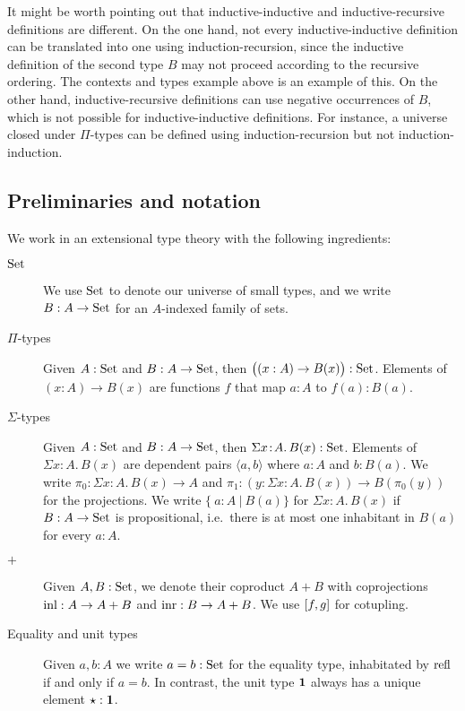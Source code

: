 \documentclass[orivec,envcountsame, ,envcountsect]{llncs}
\begin{document}
It might be worth pointing out that inductive-inductive and
inductive-recursive definitions are different. On the one hand, not
every inductive-inductive definition can be %
translated into one using induction-recursion, since the inductive
definition of the second type $B$ may not proceed according to the
recursive ordering. The contexts and types example above is an example
of this. On the other hand, inductive-recursive definitions can use
negative occurrences of $B$, which is not possible for
inductive-inductive definitions. For instance, a universe closed under
$\Pi$-types can be defined using induction-recursion but not
induction-induction.




\subsection{Preliminaries and notation}

We work in an extensional type theory \cite{NPS1990book} with the
following ingredients:
\begin{description}
\item[$\text{Set}$] We use $\text{Set}$ to denote our universe of small types, and
  we write $B : A \to \text{Set}$ for an $A$-indexed family of sets.
\item[$\Pi$-types] Given $A : \text{Set}$ and $B : A \to \text{Set}$, then $\big((x :
  A) \to B(x)\big) : \text{Set}$.  Elements of $(x : A) \to B(x)$ are
  functions $f$ that map $a : A$ to $f(a) : B(a)$.
\item[$\Sigma$-types] Given $A : \text{Set}$ and $B : A \to \text{Set}$, then
  $\Sigma x\!:\!A.\, B(x) : \text{Set}$. Elements of $\Sigma x\!:\!A.\,
  B(x)$ are dependent pairs $\langle a, b\rangle$ where $a : A$ and $b : B(a)$.
  We write $\pi_0 : \Sigma x\!:\!A.\, B(x) \to A$ and $\pi_1 : (y :
  \Sigma x\!:\!A.\, B(x)) \to B(\pi_0(y))$ for the projections. We write $\{\ a : A\ |\
  B(a)\}$ for $\Sigma x\!:\!A.\, B(x)$ if $B
  : A \to \text{Set}$ is propositional, i.e.\ there is at most one
  inhabitant in $B(a)$ for every $a : A$.
\item[$+$] Given $A, B : \text{Set}$, we denote their coproduct $A + B$ with
  coprojections $\text{inl} : A \to A + B$ and $\text{inr} : B \to A + B$. We
  use $[f, g]$ for cotupling.
\item[Equality and unit types] Given $a, b : A$ we write $a = b :
  \text{Set}$ for the equality type, inhabitated by $\text{refl}$ if and only if
  $a = b$. In contrast, the unit type $\mathbf{1}$
always has a unique element  $\star : \mathbf{1}$.
\end{description}
\end{document}

